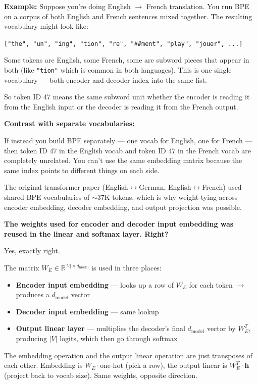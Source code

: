 \textbf{Example:} Suppose you're doing English $\to$ French translation. You run BPE on a corpus of both English and French sentences mixed together. The resulting vocabulary might look like:

\texttt{["the", "un", "ing", "tion", "re", "\#\#ment", "play", "jouer", ...]}

Some tokens are English, some French, some are subword pieces that appear in both (like \texttt{"tion"} which is common in both languages). This is one single vocabulary --- both encoder and decoder index into the same list.

So token ID 47 means the same subword unit whether the encoder is reading it from the English input or the decoder is reading it from the French output.

\textbf{Contrast with separate vocabularies:}

If instead you build BPE separately --- one vocab for English, one for French --- then token ID 47 in the English vocab and token ID 47 in the French vocab are completely unrelated. You can't use the same embedding matrix because the same index points to different things on each side.

The original transformer paper (English$\leftrightarrow$German, English$\leftrightarrow$French) used shared BPE vocabularies of $\sim$37K tokens, which is why weight tying across encoder embedding, decoder embedding, and output projection was possible.

\bigskip

\textbf{The weights used for encoder and decoder input embedding was reused in the linear and softmax layer. Right?}

Yes, exactly right.

The matrix $W_E \in \mathbb{R}^{|V| \times d_{\text{model}}}$ is used in three places:
\begin{itemize}
  \item \textbf{Encoder input embedding} --- looks up a row of $W_E$ for each token $\to$ produces a $d_{\text{model}}$ vector
  \item \textbf{Decoder input embedding} --- same lookup
  \item \textbf{Output linear layer} --- multiplies the decoder's final $d_{\text{model}}$ vector by $W_E^T$, producing $|V|$ logits, which then go through softmax
\end{itemize}

The embedding operation and the output linear operation are just transposes of each other. Embedding is $W_E \cdot \text{one-hot}$ (pick a row), the output linear is $W_E^T \cdot \mathbf{h}$ (project back to vocab size). Same weights, opposite direction.

